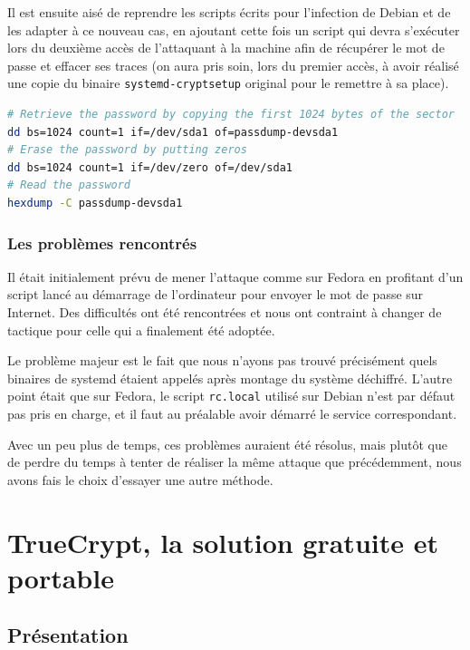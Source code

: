 \documentclass[12pt,a4paper]{article}
\begin{document}
Il est ensuite aisé de reprendre les scripts écrits pour l'infection de Debian et de les adapter à ce nouveau cas, en ajoutant cette fois un script qui devra s'exécuter lors du deuxième accès de l'attaquant à la machine afin de récupérer le mot de passe et effacer ses traces (on aura pris soin, lors du premier accès, à avoir réalisé une copie du binaire \texttt{systemd-cryptsetup} original pour le remettre à sa place).

\begin{lstlisting}[language=Bash]
# Retrieve the password by copying the first 1024 bytes of the sector
dd bs=1024 count=1 if=/dev/sda1 of=passdump-devsda1
# Erase the password by putting zeros
dd bs=1024 count=1 if=/dev/zero of=/dev/sda1
# Read the password
hexdump -C passdump-devsda1
\end{lstlisting}


\subsubsection*{Les problèmes rencontrés}

Il était initialement prévu de mener l'attaque comme sur Fedora en profitant d'un script lancé au démarrage de l'ordinateur pour envoyer le mot de passe sur Internet. Des difficultés ont été rencontrées et nous ont contraint à changer de tactique pour celle qui a finalement été adoptée.

Le problème majeur est le fait que nous n'ayons pas trouvé précisément quels binaires de systemd étaient appelés après montage du système déchiffré. L'autre point était que sur Fedora, le script \texttt{rc.local} utilisé sur Debian n'est par défaut pas pris en charge, et il faut au préalable avoir démarré le service correspondant.

Avec un peu plus de temps, ces problèmes auraient été résolus, mais plutôt que de perdre du temps à tenter de réaliser la même attaque que précédemment, nous avons fais le choix d'essayer une autre méthode.


\clearpage
\section{TrueCrypt, la solution gratuite et portable}

\subsection{Présentation}
\end{document}
